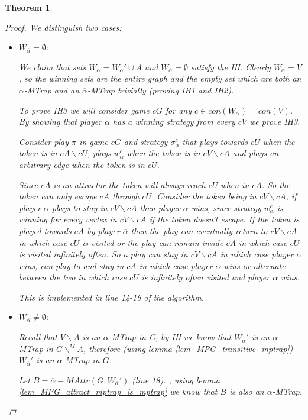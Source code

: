 \documentclass[]{article}
\newtheorem{theorem}{Theorem}[section]
\begin{document}
\begin{theorem}
\begin{proof}
		 We distinguish two cases:
		\begin{itemize}
			\item $W_{\overline{\alpha}} = \emptyset$:
			
			We claim that sets $W_\alpha = W_\alpha' \cup A$ and $W_{\overline{\alpha}} = \emptyset$ satisfy the IH. Clearly $W_\alpha = V$, so the winning sets are the entire graph and the empty set which are both an $\alpha$-MTrap and an $\overline{\alpha}$-MTrap trivially (proving IH1 and IH2).
			
			To prove IH3 we will consider game $cG$ for any $c \in con(W_\alpha) = con(V)$. By showing that player $\alpha$ has a winning strategy from every $cV$ we prove IH3.
			
			Consider play $\pi$ in game $cG$ and strategy $\sigma_\alpha^c$ that plays towards $cU$ when the token is in $cA \backslash cU$, plays $w^c_\alpha$ when the token is in $cV \backslash cA$ and plays an arbitrary edge when the token is in $cU$.
			
			Since $cA$ is an attractor the token will always reach $cU$ when in $cA$. So the token can only escape $cA$ through $cU$. Consider the token being in $cV\backslash cA$, if player $\overline{\alpha}$ plays to stay in $cV \backslash cA$ then player $\alpha$ wins, since strategy $w_\alpha^c$ is winning for every vertex in $cV \backslash cA$ if the token doesn't escape. If the token is played towards $cA$ by player $\overline{\alpha}$ then the play can eventually return to $cV \backslash cA$ in which case $cU$ is visited or the play can remain inside $cA$ in which case $cU$ is visited infinitely often. So a play can stay in $cV\backslash cA$ in which case player $\alpha$ wins, can play to and stay in $cA$ in which case player $\alpha$ wins or alternate between the two in which case $cU$ is infinitely often visited and player $\alpha$ wins.
			
			This is implemented in line 14-16 of the algorithm.
			
			\item $W_{\overline{\alpha}} \neq \emptyset$:
			
			Recall that $V \backslash A$ is an $\alpha$-MTrap in G, by IH we know that $W_{\overline{\alpha}}'$ is an $\alpha$-MTrap in $G\backslash^{\!\!M} A$, therefore (using lemma \ref{lem_MPG_transitive_mptrap}) $W_{\overline{\alpha}}'$ is an $\alpha$-MTrap in $G$.
			
			Let $B = \overline{\alpha}{-}MAttr(G, W_{\overline{\alpha}}')$ (line 18). , using lemma \ref{lem_MPG_attract_mptrap_is_mptrap} we know that $B$ is also an $\alpha$-MTrap.
			

\end{itemize}
\end{proof}
\end{theorem}
\end{document}

